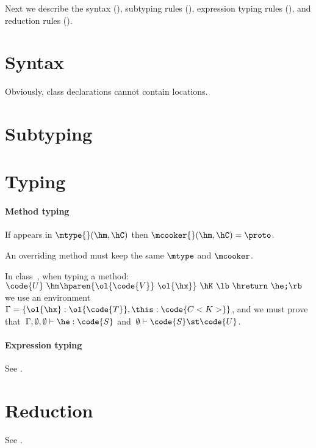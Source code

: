 \documentclass[10pt,a4paper]{article}
\begin{document}
\begin{smaller}




\end{smaller}


Next we describe the syntax (),
    subtyping rules (),
    expression typing rules (),
    and reduction rules ().

\section{Syntax}
Obviously, class declarations cannot contain locations.

\section{Subtyping}


\section{Typing}
\paragraph{Method typing}
If \proto appears in $\mtype{}(\hm,\hC)$ then $\mcooker{}(\hm,\hC)=\proto$.

An overriding method must keep the same $\mtype$ and $\mcooker$.

In class~\hC, when typing a method:
        $\code{U} ~ \hm\hparen{\ol{\code{V}} ~ \ol{\hx}} ~ \hK~ \lb\ \hreturn ~ \he\texttt{;} \rb$\\
        we use an environment~$\Gamma=\{\ol{\hx}:\ol{\code{T}}, \this:\code{C<K>}\}$,
        and we must prove that~$\Gamma,\emptyset,\emptyset \vdash \he:\code{S}$
        and~$\emptyset \vdash \code{S} \st \code{U}$.

\paragraph{Expression typing}
See .


\section{Reduction}
See .
\end{document}
